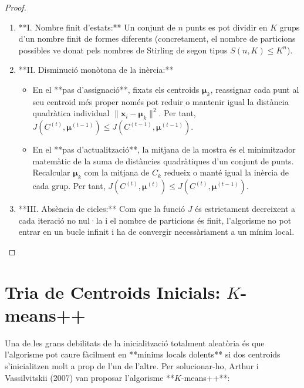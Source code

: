 \documentclass[11pt, a4paper]{article}
\begin{document}
\begin{proof}
\begin{enumerate}
    \item **I. Nombre finit d'estats:** Un conjunt de $n$ punts es pot dividir en $K$ grups d'un nombre finit de formes diferents (concretament, el nombre de particions possibles ve donat pels nombres de Stirling de segon tipus $S(n, K) \le K^n$).
    \item **II. Disminució monòtona de la inèrcia:** 
    \begin{itemize}
        \item En el **pas d'assignació**, fixats els centroids $\boldsymbol{\mu}_k$, reassignar cada punt al seu centroid més proper només pot reduir o mantenir igual la distància quadràtica individual $\lVert \mathbf{x}_i - \boldsymbol{\mu}_k \rVert^2$. Per tant, $J(C^{(t)}, \boldsymbol{\mu}^{(t-1)}) \le J(C^{(t-1)}, \boldsymbol{\mu}^{(t-1)})$.
        \item En el **pas d'actualització**, la mitjana de la mostra és el minimitzador matemàtic de la suma de distàncies quadràtiques d'un conjunt de punts. Recalcular $\boldsymbol{\mu}_k$ com la mitjana de $C_k$ redueix o manté igual la inèrcia de cada grup. Per tant, $J(C^{(t)}, \boldsymbol{\mu}^{(t)}) \le J(C^{(t)}, \boldsymbol{\mu}^{(t-1)})$.
    \end{itemize}
    \item **III. Absència de cicles:** Com que la funció $J$ és estrictament decreixent a cada iteració no nul·la i el nombre de particions és finit, l'algorisme no pot entrar en un bucle infinit i ha de convergir necessàriament a un mínim local.
\end{enumerate}
\end{proof}

\section{Tria de Centroids Inicials: $K$-means++}

Una de les grans debilitats de la inicialització totalment aleatòria és que l'algorisme pot caure fàcilment en **mínims locals dolents** si dos centroids s'inicialitzen molt a prop de l'un de l'altre. Per solucionar-ho, Arthur i Vassilvitskii (2007) van proposar l'algorisme **$K$-means++**:
\end{document}
